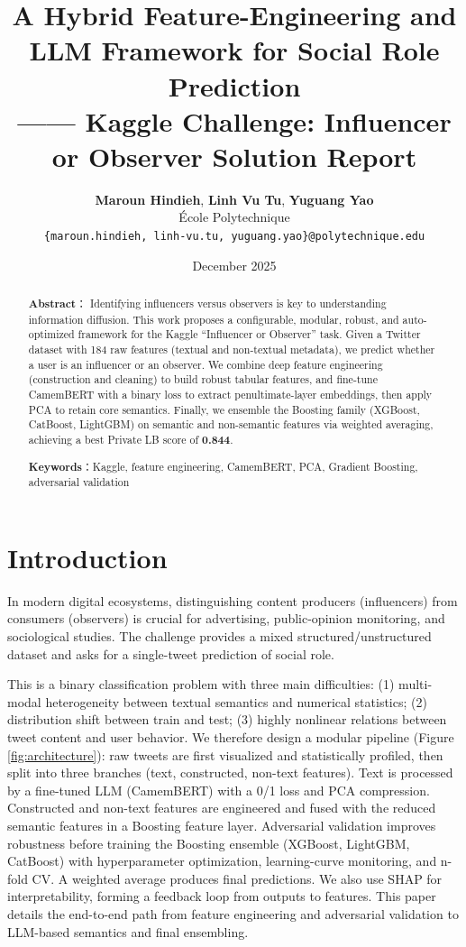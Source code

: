 \documentclass[twocolumn, a4paper, 10pt]{article}
\title{\textbf{A Hybrid Feature-Engineering and LLM Framework for Social Role Prediction}\\ \large —— Kaggle Challenge: Influencer or Observer Solution Report}
\author{
    \textbf{Maroun Hindieh}, \textbf{Linh Vu Tu}, \textbf{Yuguang Yao} \\
    École Polytechnique \\
    \texttt{\{maroun.hindieh, linh-vu.tu, yuguang.yao\}@polytechnique.edu}
}
\date{December 2025}
\begin{document}
\maketitle

\begin{abstract}
\textbf{Abstract}：
Identifying influencers versus observers is key to understanding information diffusion. This work proposes a configurable, modular, robust, and auto-optimized framework for the Kaggle “Influencer or Observer” task. Given a Twitter dataset with 184 raw features (textual and non-textual metadata), we predict whether a user is an influencer or an observer. We combine deep feature engineering (construction and cleaning) to build robust tabular features, and fine-tune CamemBERT with a binary loss to extract penultimate-layer embeddings, then apply PCA to retain core semantics. Finally, we ensemble the Boosting family (XGBoost, CatBoost, LightGBM) on semantic and non-semantic features via weighted averaging, achieving a best Private LB score of \textbf{0.844}.

\vspace{0.5em}
\noindent \textbf{Keywords}：Kaggle, feature engineering, CamemBERT, PCA, Gradient Boosting, adversarial validation
\end{abstract}

\section{Introduction}

In modern digital ecosystems, distinguishing content producers (influencers) from consumers (observers) is crucial for advertising, public-opinion monitoring, and sociological studies. The challenge provides a mixed structured/unstructured dataset and asks for a single-tweet prediction of social role.

This is a binary classification problem with three main difficulties: (1) multi-modal heterogeneity between textual semantics and numerical statistics; (2) distribution shift between train and test; (3) highly nonlinear relations between tweet content and user behavior. We therefore design a modular pipeline (Figure \ref{fig:architecture}): raw tweets are first visualized and statistically profiled, then split into three branches (text, constructed, non-text features). Text is processed by a fine-tuned LLM (CamemBERT) with a 0/1 loss and PCA compression. Constructed and non-text features are engineered and fused with the reduced semantic features in a Boosting feature layer. Adversarial validation improves robustness before training the Boosting ensemble (XGBoost, LightGBM, CatBoost) with hyperparameter optimization, learning-curve monitoring, and n-fold CV. A weighted average produces final predictions. We also use SHAP for interpretability, forming a feedback loop from outputs to features. This paper details the end-to-end path from feature engineering and adversarial validation to LLM-based semantics and final ensembling.
\end{document}
